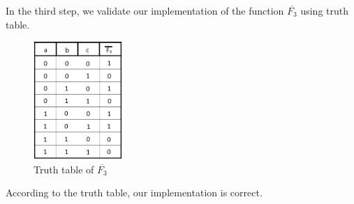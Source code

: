 \documentclass[pdftex,12pt,a4paper]{article}
\begin{document}
\begin{itemize}
   In the third step, we validate our implementation of the function $\overline{F_3}$ using truth table.\\
    \begin{figure}[H]
    \centering
        \includegraphics[width=0.3\textwidth]{truth.png}	
        \caption{Truth table of \textbf{$\overline{F_3}$}}
        
   \end{figure}
    According to the truth table, our implementation is correct.
\end{itemize}
\end{document}

